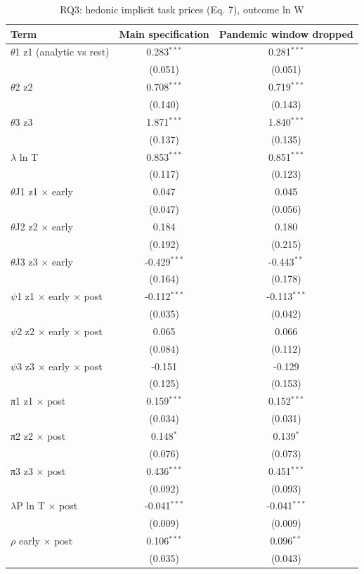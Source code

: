 \begin{table}[htbp]\centering
\caption{RQ3: hedonic implicit task prices (Eq. 7), outcome ln W}
\begin{tabular}{lcc}
\toprule
Term & Main specification & Pandemic window dropped \\
\midrule
$\theta$1  z1 (analytic vs rest) & 0.283$^{***}$ & 0.281$^{***}$ \\
 & (0.051) & (0.051) \\
$\theta$2  z2 & 0.708$^{***}$ & 0.719$^{***}$ \\
 & (0.140) & (0.143) \\
$\theta$3  z3 & 1.871$^{***}$ & 1.840$^{***}$ \\
 & (0.137) & (0.135) \\
$\lambda$  ln T & 0.853$^{***}$ & 0.851$^{***}$ \\
 & (0.117) & (0.123) \\
$\theta$J1  z1 $\times$ early & 0.047 & 0.045 \\
 & (0.047) & (0.056) \\
$\theta$J2  z2 $\times$ early & 0.184 & 0.180 \\
 & (0.192) & (0.215) \\
$\theta$J3  z3 $\times$ early & -0.429$^{***}$ & -0.443$^{**}$ \\
 & (0.164) & (0.178) \\
$\psi$1  z1 $\times$ early $\times$ post & -0.112$^{***}$ & -0.113$^{***}$ \\
 & (0.035) & (0.042) \\
$\psi$2  z2 $\times$ early $\times$ post & 0.065 & 0.066 \\
 & (0.084) & (0.112) \\
$\psi$3  z3 $\times$ early $\times$ post & -0.151 & -0.129 \\
 & (0.125) & (0.153) \\
π1  z1 $\times$ post & 0.159$^{***}$ & 0.152$^{***}$ \\
 & (0.034) & (0.031) \\
π2  z2 $\times$ post & 0.148$^{*}$ & 0.139$^{*}$ \\
 & (0.076) & (0.073) \\
π3  z3 $\times$ post & 0.436$^{***}$ & 0.451$^{***}$ \\
 & (0.092) & (0.093) \\
$\lambda$P  ln T $\times$ post & -0.041$^{***}$ & -0.041$^{***}$ \\
 & (0.009) & (0.009) \\
$\rho$  early $\times$ post & 0.106$^{***}$ & 0.096$^{**}$ \\
 & (0.035) & (0.043) \\
\bottomrule
\end{tabular}
\par\vspace{2pt}{\footnotesize State-by-quarter and industry fixed effects; controls sex, age, education. Standard errors clustered on occupation in parentheses. * p<0.10, ** p<0.05, *** p<0.01. Not shown because identical to the main specification (Eq. 7 does not use exposure): GPT-4-rated exposure, LM-AIOE exposure.}
\end{table}
